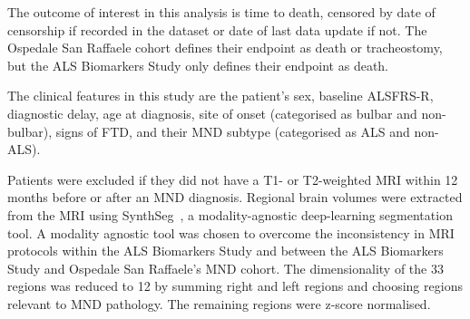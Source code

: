The outcome of interest in this analysis is time to death, censored by date of censorship if recorded in the dataset or date of last data update if not.
The Ospedale San Raffaele cohort defines their endpoint as death or tracheostomy, but the ALS Biomarkers Study only defines their endpoint as death.

The clinical features in this study are the patient's sex, baseline ALSFRS-R, diagnostic delay, age at diagnosis, site of onset (categorised as bulbar and non-bulbar), signs of FTD, and their MND subtype (categorised as ALS and non-ALS).

Patients were excluded if they did not have a T1- or T2-weighted MRI within 12 months before or after an MND diagnosis.
Regional brain volumes were extracted from the MRI using SynthSeg~\cite{billotSynthSegDomainRandomisation2021}, a modality-agnostic deep-learning segmentation tool.
A modality agnostic tool was chosen to overcome the inconsistency in MRI protocols within the ALS Biomarkers Study and between the ALS Biomarkers Study and Ospedale San Raffaele's MND cohort.
The dimensionality of the 33 regions was reduced to 12 by summing right and left regions and choosing regions relevant to MND pathology.
The remaining regions were z-score normalised.

